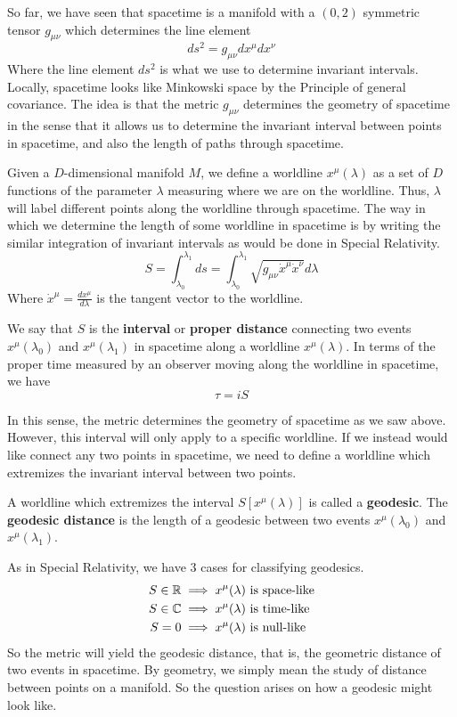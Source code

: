 \documentclass{article}
\begin{document}
 			So far, we have seen that spacetime is a manifold with a $(0,2)$ symmetric tensor $g_{\mu\nu}$ which determines the line element
 			$$ ds^2 = g_{\mu\nu} dx^\mu dx^\nu$$
 			Where the line element $ds^2$ is what we use to determine invariant intervals. Locally, spacetime looks like Minkowski space by the Principle of general covariance. The idea is that the metric $g_{\mu\nu}$ determines the geometry of spacetime in the sense that it allows us to determine the invariant interval between points in spacetime, and also the length of paths through spacetime. 
 			
 			Given a $D$-dimensional manifold $M$, we define a worldline $x^\mu(\lambda)$ as a set of $D$ functions of the parameter $\lambda$ measuring where we are on the worldline. Thus, $\lambda$ will label different points along the worldline through spacetime. The way in which we determine the length of some worldline in spacetime is by writing the similar integration of invariant intervals as would be done in Special Relativity.
 			\begin{equation}
 				\label{eq:DefiniteInterval}
 				\boxed{S = \int_{\lambda_0}^{\lambda_1} ds 
 				= \int_{\lambda_0}^{\lambda_1} \sqrt{g_{\mu\nu} \dot{x}^\mu \dot{x}^\nu} d\lambda}
 			\end{equation}
 			Where $\dot{x}^\mu = \frac{dx^\mu}{d\lambda}$ is the tangent vector to the worldline.
 			\begin{defn}
 				We say that $S$ is the \textbf{interval} or \textbf{proper distance} connecting two events $x^\mu (\lambda_0)$ and $x^\mu (\lambda_1)$ in spacetime along a worldline $x^\mu (\lambda)$. In terms of the proper time measured by an observer moving along the worldline in spacetime, we have
 				$$ \tau = iS$$
 			\end{defn}
 			In this sense, the metric determines the geometry of spacetime as we saw above. However, this interval will only apply to a specific worldline. If we instead would like connect any two points in spacetime, we need to define a worldline which extremizes the invariant interval between two points.
 			\begin{defn}
 				A worldline which extremizes the interval $ S\left[ x^\mu (\lambda) \right]$ is called a \textbf{geodesic}. The \textbf{geodesic distance} is the length of a geodesic between two events $x^\mu (\lambda_0)$ and $x^\mu (\lambda_1)$.
 			\end{defn} 
 			As in Special Relativity, we have 3 cases for classifying geodesics.
 			\begin{align*}
 				S \in \mathbb{R} &\implies x^\mu(\lambda) \text{ is space-like}\\
 				S \in \mathbb{C} &\implies x^\mu(\lambda) \text{ is time-like}\\
 				S = 0 &\implies x^\mu(\lambda) \text{ is null-like}
 			\end{align*}
 			So the metric will yield the geodesic distance, that is, the geometric distance of two events in spacetime. By geometry, we simply mean the study of distance between points on a manifold. So the question arises on how a geodesic might look like. 
 			
\end{document}
